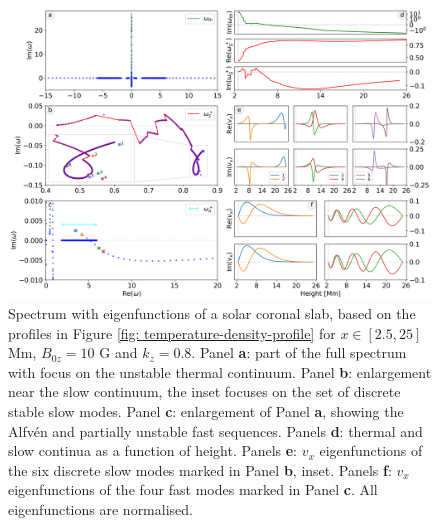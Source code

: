 \begin{figure}[t]
  \centering
  \includegraphics[width=\textwidth]{SA_corona.png}
  \caption{
    Spectrum with eigenfunctions of a solar coronal slab, based on the profiles in Figure \ref{fig: temperature-density-profile} for $x \in [2.5, 25]$ Mm, $B_{0z} = 10$ G and $k_z = 0.8$. Panel \textbf{a}: part of the full spectrum with focus on the unstable thermal continuum. Panel \textbf{b}: enlargement near the slow continuum, the inset focuses on the set of discrete stable slow modes. Panel \textbf{c}: enlargement of Panel \textbf{a}, showing the Alfv\'en and partially unstable fast sequences. Panels \textbf{d}: thermal and slow continua as a function of height. Panels \textbf{e}: $v_x$ eigenfunctions of the six discrete slow modes marked in Panel \textbf{b}, inset. Panels \textbf{f}: $v_x$ eigenfunctions of the four fast modes marked in Panel \textbf{c}. All eigenfunctions are normalised.
  }
  \label{fig: spectrum_corona}
\end{figure}

